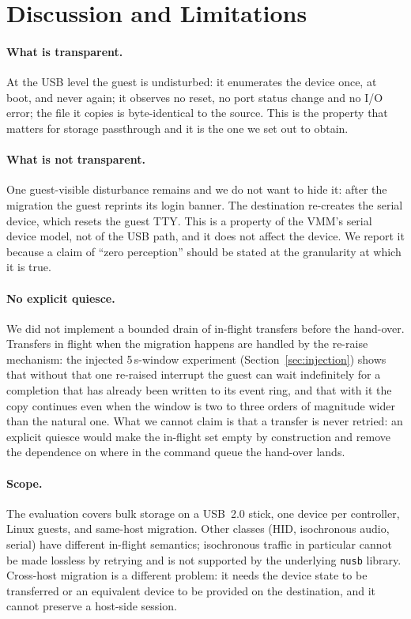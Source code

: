 \documentclass[10pt,conference]{IEEEtran}
\newcommand{\code}[1]{\texttt{#1}}
\begin{document}
\section{Discussion and Limitations}
\label{sec:discussion}

\paragraph{What is transparent.}
At the USB level the guest is undisturbed: it enumerates the device once, at
boot, and never again; it observes no reset, no port status change and no I/O
error; the file it copies is byte-identical to the source. This is the property
that matters for storage passthrough and it is the one we set out to obtain.

\paragraph{What is not transparent.}
One guest-visible disturbance remains and we do not want to hide it: after the
migration the guest reprints its login banner. The destination re-creates the
serial device, which resets the guest TTY. This is a property of the VMM's
serial device model, not of the USB path, and it does not affect the device. We
report it because a claim of ``zero perception'' should be stated at the
granularity at which it is true.

\paragraph{No explicit quiesce.}
We did not implement a bounded drain of in-flight transfers before the
hand-over. Transfers in flight when the migration happens are handled by the
re-raise mechanism: the injected 5\,s-window experiment
(Section~\ref{sec:injection}) shows that without that one re-raised interrupt the
guest can wait indefinitely for a completion that has already been written to
its event ring, and that with it the copy continues even when the window is
two to three orders of magnitude wider than the natural one. What we cannot claim is
that a transfer is never retried: an explicit quiesce would make the in-flight
set empty by construction and remove the dependence on where in the command
queue the hand-over lands.

\paragraph{Scope.}
The evaluation covers bulk storage on a USB~2.0 stick, one device per
controller, Linux guests, and same-host migration. Other classes (HID,
isochronous audio, serial) have different in-flight semantics; isochronous
traffic in particular cannot be made lossless by retrying and is not supported
by the underlying \code{nusb} library. Cross-host migration is a different
problem: it needs the device state to be transferred or an equivalent device to
be provided on the destination, and it cannot preserve a host-side session.
\end{document}
